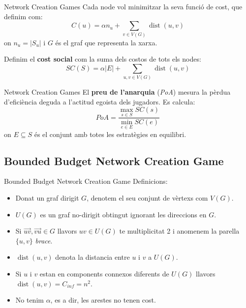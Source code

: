\documentclass[aspectratio=169]{beamer}
\DeclareMathOperator{\dist}{dist}
\begin{document}
\begin{frame}{Network Creation Games}
    Cada node vol minimitzar la seva funció de cost, que definim com:
    \begin{equation*}
        C(u) = \alpha n_u + \sum_{v \in V(G)}\dist(u,v)
    \end{equation*}
    on $n_u = |S_u|$ i $G$ és el graf que representa la xarxa.
    
    \vspace{1.5em}
    
    Definim el \textbf{cost social} com la suma dels costos de tots els nodes:
    \begin{equation*}
        SC(S) = \alpha |E| + \sum_{u,v \in V(G)} \dist(u,v)
    \end{equation*}
\end{frame}

\begin{frame}{Network Creation Games}
    El \textbf{preu de l'anarquia} (\emph{PoA}) mesura la pèrdua d'eficiència deguda a l'actitud egoista dels jugadors. Es calcula:
    \begin{equation*}
        PoA = \frac{\max_{s \in S} SC(s)}{\min_{e \in E} SC(e)}
    \end{equation*}
    on $E \subseteq S$ és el conjunt amb totes les estratègies en equilibri.
\end{frame}

\subsection{Bounded Budget Network Creation Game}
\begin{frame}{Bounded Budget Network Creation Game}
Definicions:
\begin{itemize}
    \item<1-> Donat un graf dirigit $G$, denotem el seu conjunt de vèrtexs com $V(G)$.
    \item<2-> $U(G)$ es un graf no-dirigit obtingut ignorant les direccions en $G$.
    \item<3-> Si $\vec{uv}, \vec{vu} \in G$ llavors $uv \in U(G)$ te multiplicitat 2 i
        anomenem la parella $\{u, v\}$ \emph{brace}.
    \item<4-> $\dist(u, v)$ denota la distancia entre $u$ i $v$ a $U(G)$.
    \item<5-> Si $u$ i $v$ estan en components connexos diferents de $U(G)$ llavors
        $\dist(u, v) = C_{inf} = n^2$.
    \item<6-> No tenim $\alpha$, es a dir, les arestes no tenen cost.
        
    
\end{itemize}
\end{frame} 
\end{document}
